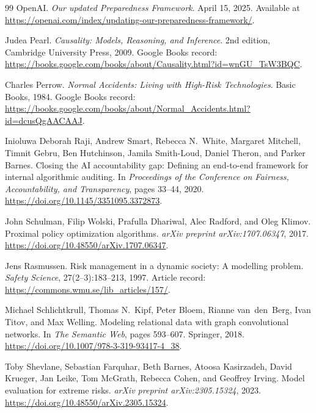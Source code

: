 \documentclass[11pt]{article}
\begin{document}
\begin{thebibliography}{99}
OpenAI.
\textit{Our updated Preparedness Framework}.
April 15, 2025.
Available at \url{https://openai.com/index/updating-our-preparedness-framework/}.

Judea Pearl.
\textit{Causality: Models, Reasoning, and Inference}.
2nd edition, Cambridge University Press, 2009.
Google Books record: \url{https://books.google.com/books/about/Causality.html?id=wnGU_TsW3BQC}.

Charles Perrow.
\textit{Normal Accidents: Living with High-Risk Technologies}.
Basic Books, 1984.
Google Books record: \url{https://books.google.com/books/about/Normal_Accidents.html?id=dcusQgAACAAJ}.

Inioluwa Deborah Raji, Andrew Smart, Rebecca N.~White, Margaret Mitchell, Timnit Gebru, Ben Hutchinson, Jamila Smith-Loud, Daniel Theron, and Parker Barnes.
Closing the AI accountability gap: Defining an end-to-end framework for internal algorithmic auditing.
In \textit{Proceedings of the Conference on Fairness, Accountability, and Transparency}, pages 33--44, 2020.
\url{https://doi.org/10.1145/3351095.3372873}.

John Schulman, Filip Wolski, Prafulla Dhariwal, Alec Radford, and Oleg Klimov.
Proximal policy optimization algorithms.
\textit{arXiv preprint arXiv:1707.06347}, 2017.
\url{https://doi.org/10.48550/arXiv.1707.06347}.

Jens Rasmussen.
Risk management in a dynamic society: A modelling problem.
\textit{Safety Science}, 27(2--3):183--213, 1997.
Article record: \url{https://commons.wmu.se/lib_articles/157/}.

Michael Schlichtkrull, Thomas N.~Kipf, Peter Bloem, Rianne van~den~Berg, Ivan Titov, and Max Welling.
Modeling relational data with graph convolutional networks.
In \textit{The Semantic Web}, pages 593--607. Springer, 2018.
\url{https://doi.org/10.1007/978-3-319-93417-4_38}.

Toby Shevlane, Sebastian Farquhar, Beth Barnes, Atoosa Kasirzadeh, David Krueger, Jan Leike, Tom McGrath, Rebecca Cohen, and Geoffrey Irving.
Model evaluation for extreme risks.
\textit{arXiv preprint arXiv:2305.15324}, 2023.
\url{https://doi.org/10.48550/arXiv.2305.15324}.


\end{thebibliography}
\end{document}
